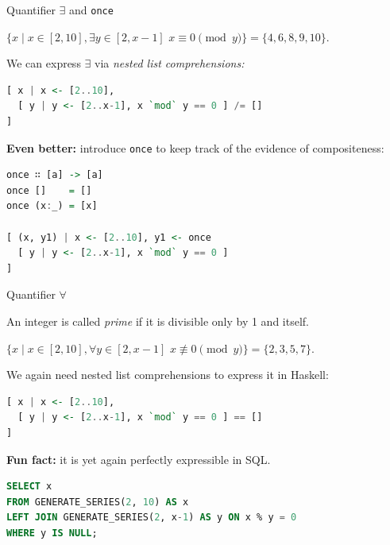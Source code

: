 \documentclass[handout]{beamer}
\begin{document}
\begin{frame}[fragile]{Quantifier $\exists$ and {\tt once}}

$ \{ x \mid x \in [2, 10], \exists y \in [2, x-1] \,\, x \equiv 0 \pmod y \} =
\{ 4,6,8,9,10 \}$.

\bigskip

We can express $\exists$ via {\em nested list comprehensions:}

\begin{lstlisting}[language=Haskell]
[ x | x <- [2..10],
  [ y | y <- [2..x-1], x `mod` y == 0 ] /= []
]
\end{lstlisting}

\pause

{\bf Even better:} introduce {\tt once} to keep track of the evidence of compositeness:

\begin{lstlisting}[language=Haskell]
once ∷ [a] -> [a]
once []    = []
once (x:_) = [x]

[ (x, y1) | x <- [2..10], y1 <- once
  [ y | y <- [2..x-1], x `mod` y == 0 ]
]
\end{lstlisting}


\end{frame}

\begin{frame}[fragile]{Quantifier $\forall$}

An integer is called {\em prime} if it is divisible only by 1 and itself.

\bigskip

$ \{ x \mid x \in [2, 10], \forall y \in [2, x-1] \,\, x \not\equiv 0 \pmod y \} =
\{ 2,3,5,7 \}$.

\bigskip

\pause

We again need nested list comprehensions to express it in Haskell:
\begin{lstlisting}[language=Haskell]
[ x | x <- [2..10],
  [ y | y <- [2..x-1], x `mod` y == 0 ] == []
]
\end{lstlisting}

\pause

{\bf Fun fact:} it is yet again perfectly expressible in SQL.
\begin{lstlisting}[language=SQL]
SELECT x
FROM GENERATE_SERIES(2, 10) AS x
LEFT JOIN GENERATE_SERIES(2, x-1) AS y ON x % y = 0
WHERE y IS NULL;
\end{lstlisting}

\end{frame}
\end{document}
